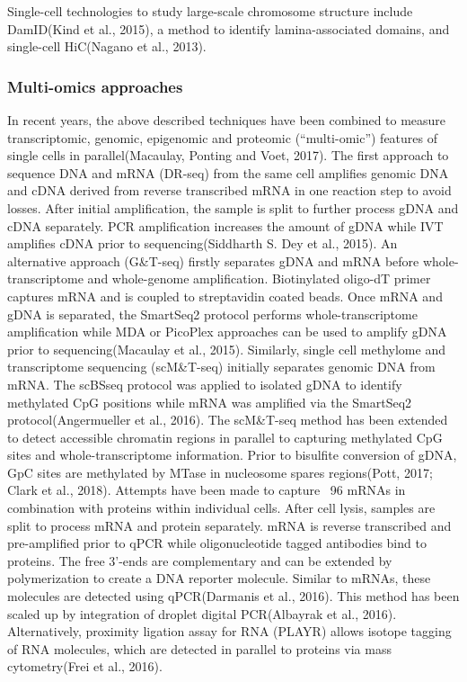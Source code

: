 Single-cell technologies to study large-scale chromosome structure include DamID(Kind et al., 2015), a method to identify lamina-associated domains, and single-cell HiC(Nagano et al., 2013).

\subsubsection{Multi-omics approaches}

In recent years, the above described techniques have been combined to measure transcriptomic, genomic, epigenomic and proteomic (“multi-omic”) features of single cells in parallel(Macaulay, Ponting and Voet, 2017).
The first approach to sequence DNA and mRNA (DR-seq) from the same cell amplifies genomic DNA and cDNA derived from reverse transcribed mRNA in one reaction step to avoid losses. After initial amplification, the sample is split to further process gDNA and cDNA separately. PCR amplification increases the amount of gDNA while IVT amplifies cDNA prior to sequencing(Siddharth S. Dey et al., 2015). An alternative approach (G\&{}T-seq) firstly separates gDNA and mRNA before whole-transcriptome and whole-genome amplification. Biotinylated oligo-dT primer captures mRNA and is coupled to streptavidin coated beads. Once mRNA and gDNA is separated, the SmartSeq2 protocol performs whole-transcriptome amplification while MDA or PicoPlex approaches can be used to amplify gDNA prior to sequencing(Macaulay et al., 2015).
Similarly, single cell methylome and transcriptome sequencing (scM\&{}T-seq) initially separates genomic DNA from mRNA. The scBSseq protocol was applied to isolated gDNA to identify methylated CpG positions while mRNA was amplified via the SmartSeq2 protocol(Angermueller et al., 2016).   
The scM\&{}T-seq method has been extended to detect accessible chromatin regions in parallel to capturing methylated CpG sites and whole-transcriptome information. Prior to bisulfite conversion of gDNA, GpC sites are methylated by MTase in nucleosome spares regions(Pott, 2017; Clark et al., 2018). 
Attempts have been made to capture ~96 mRNAs in combination with proteins within individual cells. After cell lysis, samples are split to process mRNA and protein separately. mRNA is reverse transcribed and pre-amplified prior to qPCR while oligonucleotide tagged antibodies bind to proteins. The free 3’-ends are complementary and can be extended by polymerization to create a DNA reporter molecule. Similar to mRNAs, these molecules are detected using qPCR(Darmanis et al., 2016). This method has been scaled up by integration of droplet digital PCR(Albayrak et al., 2016). Alternatively, proximity ligation assay for RNA (PLAYR) allows isotope tagging of RNA molecules, which are detected in parallel to proteins via mass cytometry(Frei et al., 2016).
